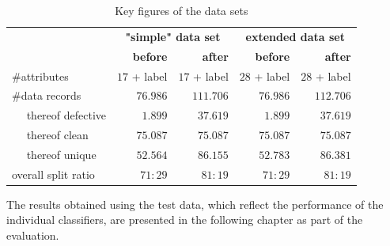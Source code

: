 \begin{table}[ht]
\centering
\caption{Key figures of the data sets}
\label{tab:dataset-numbers-new}
\begin{tabular}{|l|r|r|r|r|} 
\hline
\multirow{2}{*}{}    & \multicolumn{2}{c|}{\textbf{"simple" data set}} & \multicolumn{2}{c|}{\textbf{extended data set}}  \\ 
\cline{2-5}
                     & \textbf{before} & \textbf{after}                & \textbf{before} & \textbf{after}                 \\ 
\hline
\#attributes         & $17$ + label      & $17$ + label                    & $28$ + label      & $28$ + label                     \\ 
\hline
\#data records       & $76.986$          & $111.706$                       & $76.986$          & $112.706$                        \\ 
\hline
~ ~thereof defective & $1.899$           & $37.619$                        & $1.899$           & $37.619$                         \\ 
\hline
~ ~thereof clean     & $75.087$          & $75.087$                        & $75.087$          & $75.087$                         \\ 
\hline
~ ~thereof unique    & $52.564$          & $86.155$                        & $52.783$          & $86.381$                         \\ 
\hline
overall split ratio  & $71:29$           & $81:19$                         & $71:29$           & $81:19$                          \\
\hline
\end{tabular}
\end{table}

The results obtained using the test data, which reflect the performance of the individual classifiers, are presented in the following chapter as part of the evaluation.


